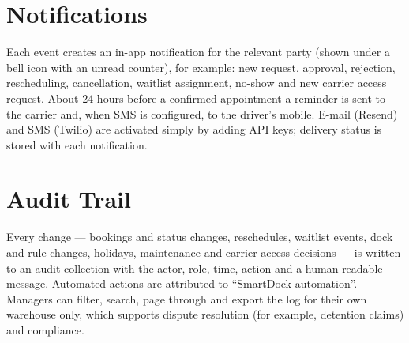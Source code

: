 \section{Notifications}
Each event creates an in-app notification for the relevant party (shown under a bell icon with an unread counter), for example: new request, approval, rejection, rescheduling, cancellation, waitlist assignment, no-show and new carrier access request. About 24 hours before a confirmed appointment a reminder is sent to the carrier and, when SMS is configured, to the driver's mobile. E-mail (Resend) and SMS (Twilio) are activated simply by adding API keys; delivery status is stored with each notification.

\section{Audit Trail}
Every change --- bookings and status changes, reschedules, waitlist events, dock and rule changes, holidays, maintenance and carrier-access decisions --- is written to an audit collection with the actor, role, time, action and a human-readable message. Automated actions are attributed to ``SmartDock automation''. Managers can filter, search, page through and export the log for their own warehouse only, which supports dispute resolution (for example, detention claims) and compliance.
